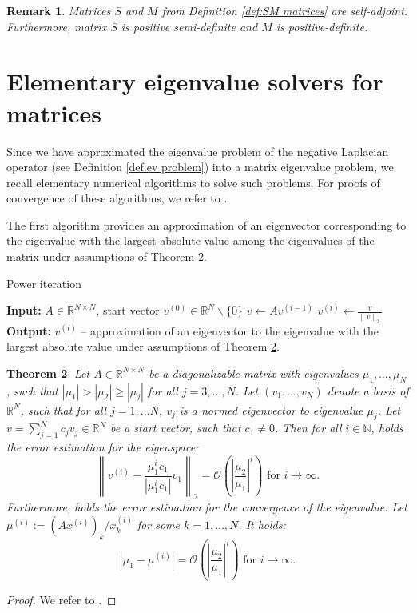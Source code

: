 \documentclass[a4paper,11pt,bibliography=totoc,listof=totoc,headinclude=true,cleardoublepage=empty,oneside]{scrbook}
\newtheorem{theorem}{Theorem}[chapter]
\newtheorem{rem}[theorem]{Remark}
\newcommand{\R}{\mathbb{R}}
\newcommand{\N}{\mathbb{N}}
\newcommand{\bigO}{\mathcal{O}}
\begin{document}
\begin{rem}
Matrices $S$ and $M$ from Definition \ref{def:SM matrices} are self-adjoint. Furthermore, matrix $S$ is positive semi-definite and $M$ is positive-definite.
\end{rem}


\section{Elementary eigenvalue solvers for matrices}
Since we have approximated the eigenvalue problem of the negative Laplacian operator (see Definition \ref{def:ev problem}) into a matrix eigenvalue problem, we recall elementary numerical algorithms to solve such problems. For proofs of convergence of these algorithms, we refer to \cite{numericsAB}.

The first algorithm provides an approximation of an eigenvector corresponding to the eigenvalue with the largest absolute value among the eigenvalues of the matrix  under assumptions of Theorem \ref{theorem:power iteration}.

\begin{algorithm}[H]
\caption{Power iteration}\label{alg:power iteration}
\begin{algorithmic}
    \State \textbf{Input:} $A \in \R^{N \times N}$, start vector $v^{(0)}\in \R^N \backslash\{0\}$
        \State $v \gets Av^{(i-1)} $
        \State $v^{(i)} \gets \frac{v}{\|v\|_2}$
    \EndFor
    \State \textbf{Output:} $v^{(i)}$ -- approximation of an eigenvector to the eigenvalue with the largest absolute value under assumptions of Theorem \ref{theorem:power iteration}.
    \end{algorithmic}
\end{algorithm}
\begin{theorem}\label{theorem:power iteration}
Let $A \in \R^{N \times N}$ be a diagonalizable matrix with eigenvalues $\mu_1, \dots, \mu_N$, such that $|\mu_1| > |\mu_2| \geqslant |\mu_j|$ for all $j = 3,\dots,N$. Let $(v_1, \dots, v_N)$ denote a basis of $\R^N$, such that for all $j=1, \dots N$, $v_j$ is a normed eigenvector to eigenvalue $\mu_j$. Let $v = \sum_{j=1}^N c_j v_j \in \R^N$ be a start vector, such that $c_1 \neq 0$. Then for all $i \in \N$, holds the error estimation for the eigenspace:
\begin{equation*}
        \left\| v^{(i)} - \frac{\mu_1^i c_1}{|\mu_1^i c_1|} v_1 \right\|_2 = \bigO\left( \left|\frac{\mu_2}{\mu_1}\right|^i\right) \text{ for } i \rightarrow \infty.
\end{equation*}
Furthermore, holds the error estimation for the convergence of the eigenvalue. Let $\mu^{(i)} := (Ax^{(i)})_k / x^{(i)}_k $ for some $k = 1, \dots, N$. It holds:
    \begin{equation*}
        |\mu_1 - \mu^{(i)}| = \bigO\left( \left|\frac{\mu_2}{\mu_1}\right|^i\right) \text{ for } i \rightarrow \infty.
    \end{equation*}
\end{theorem}
\begin{proof}
We refer to \cite[p. 116]{numericsAB}.
\end{proof}
\end{document}
